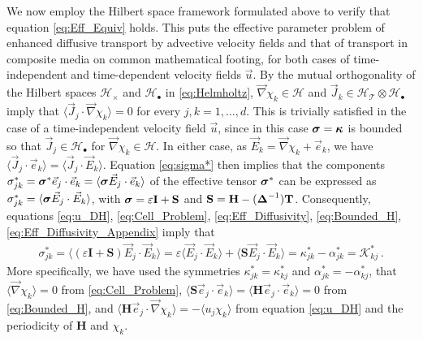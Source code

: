 \documentclass[11pt]{amsart}
\newcommand{\Tb}{\mathbf{T}}
\newcommand{\Hb}{\mathbf{H}}
\newcommand{\Ib}{\mathbf{I}}
\newcommand{\Sb}{\mathbf{S}}
\newcommand{\Kc}{\mathcal{K}}
\newcommand{\Tc}{\mathcal{T}}
\newcommand{\Hs}{\mathscr{H}}
\newcommand\bsig{\mbox{\boldmath${\sigma}$}}
\newcommand\bDelta{\mbox{\boldmath${\Delta}$}}
\newcommand\bkappa{\mbox{\boldmath${\kappa}$}}
\begin{document}
We now employ the Hilbert space framework formulated above to verify
that equation \eqref{eq:Eff_Equiv} holds. This puts the effective
parameter problem of enhanced diffusive transport by advective
velocity fields and that of transport in composite media on common
mathematical footing, for both cases of time-independent and
time-dependent velocity fields $\vec{u}$. By the mutual orthogonality
of the Hilbert spaces $\Hs_\times$ and $\Hs_\bullet$ in \eqref{eq:Helmholtz},
$\vec{\nabla}\chi_k\in\Hs$ and $\vec{J}_k\in\Hs_{\Tc}\otimes\Hs_\bullet$ imply that
$\langle\vec{J}_j\cdot\vec{\nabla}\chi_k\rangle=0$ for every $j,k=1,\ldots,d$. This is trivially
satisfied in the case of a time-independent velocity field $\vec{u}$,
since in this case $\bsig=\bkappa$ is bounded so that
$\vec{J}_j\in\Hs_\bullet$ for $\vec{\nabla}\chi_k\in\Hs$. In either case, as
$\vec{E}_k=\vec{\nabla}\chi_k+\vec{e}_k$, we have
$\langle\vec{J}_j\cdot\vec{e}_k\rangle=\langle\vec{J}_j\cdot\vec{E}_k\rangle$. Equation
\eqref{eq:sigma*} then implies that the components
$\sigma^*_{jk}=\bsig^*\vec{e}_j\cdot\vec{e}_k=\langle\bsig\vec{E}_j\cdot\vec{e}_k\rangle$ of
the effective tensor $\bsig^*$ can be expressed as
$\sigma^*_{jk}=\langle\bsig\vec{E}_j\cdot\vec{E}_k\rangle$, with $\bsig=\varepsilon\Ib+\Sb$ and
$\Sb=\Hb-(\bDelta^{-1})\Tb$. Consequently, equations \eqref{eq:u_DH},
\eqref{eq:Cell_Problem}, \eqref{eq:Eff_Diffusivity},
\eqref{eq:Bounded_H}, \eqref{eq:Eff_Diffusivity_Appendix} 
imply that     
%
\begin{align}\label{eq:Reduction}
  \sigma^*_{jk}%
       =\langle(\varepsilon\Ib+\Sb)\vec{E}_j\cdot\vec{E}_k\rangle
       =\varepsilon\langle\vec{E}_j\cdot\vec{E}_k\rangle+\langle\Sb\vec{E}_j\cdot\vec{E}_k\rangle
       =\kappa^*_{jk}-\alpha^*_{jk}
       =\Kc_{kj}^*\,.       
\end{align}
%
More specifically, we have used the symmetries $\kappa^*_{jk}=\kappa^*_{kj}$ and
$\alpha^*_{jk}=-\alpha^*_{kj}$, that $\langle\vec{\nabla}\chi_k\rangle=0$ from \eqref{eq:Cell_Problem},
$\langle\Sb\vec{e}_j\cdot\vec{e}_k\rangle=\langle\Hb\vec{e}_j\cdot\vec{e}_k\rangle=0$ from
\eqref{eq:Bounded_H}, and $\langle\Hb\vec{e}_j\cdot\vec{\nabla}\chi_k\rangle=-\langle u_j\chi_k\rangle$
from equation \eqref{eq:u_DH} and the periodicity of $\Hb$ and $\chi_k$.  
    
\end{document}

